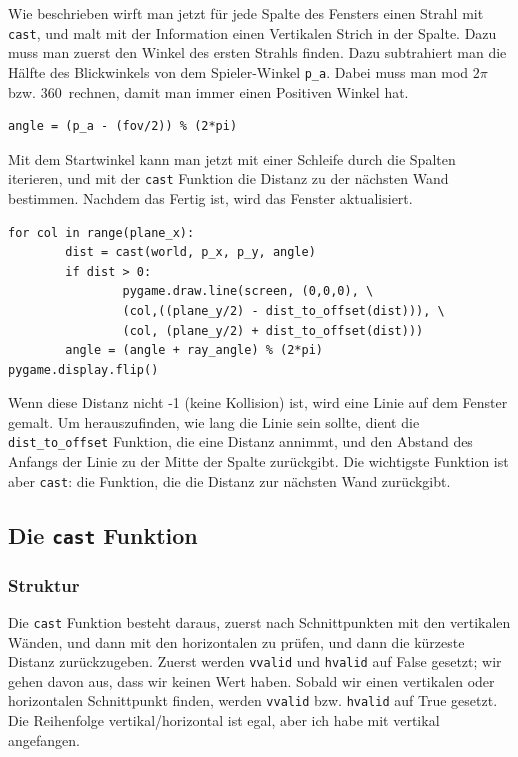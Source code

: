 \documentclass[a4paper,12pt]{report}
\begin{document}
Wie beschrieben wirft man jetzt für jede Spalte des Fensters einen Strahl mit \texttt{cast}, und malt mit der Information einen Vertikalen Strich in der Spalte. Dazu muss man zuerst den Winkel des ersten Strahls finden. Dazu subtrahiert man die Hälfte des Blickwinkels von dem Spieler-Winkel \texttt{p\_a}. Dabei muss man mod $2\pi$ bzw. 360\textdegree\ rechnen, damit man immer einen Positiven Winkel hat.
\begin{Verbatim}[baselinestretch=1.0, xleftmargin=1cm]
angle = (p_a - (fov/2)) % (2*pi)
\end{Verbatim}

Mit dem Startwinkel kann man jetzt mit einer Schleife durch die Spalten iterieren, und mit der \texttt{cast} Funktion die Distanz zu der nächsten Wand bestimmen. Nachdem das Fertig ist, wird das Fenster aktualisiert.
\begin{Verbatim}[baselinestretch=1.0, xleftmargin=1cm]
for col in range(plane_x):
        dist = cast(world, p_x, p_y, angle)
        if dist > 0:
                pygame.draw.line(screen, (0,0,0), \
                (col,((plane_y/2) - dist_to_offset(dist))), \
                (col, (plane_y/2) + dist_to_offset(dist)))
        angle = (angle + ray_angle) % (2*pi)
pygame.display.flip()
\end{Verbatim}
Wenn diese Distanz nicht -1 (keine Kollision) ist, wird eine Linie auf dem Fenster gemalt. Um herauszufinden, wie lang die Linie sein sollte, dient die \texttt{dist\_to\_offset} Funktion, die eine Distanz annimmt, und den Abstand des Anfangs der Linie zu der Mitte der Spalte zurückgibt. Die wichtigste Funktion ist aber \texttt{cast}: die Funktion, die die Distanz zur nächsten Wand zurückgibt.

\subsection{Die \texttt{cast} Funktion}
\subsubsection{Struktur}
Die \texttt{cast} Funktion besteht daraus, zuerst nach Schnittpunkten mit den vertikalen Wänden, und dann mit den horizontalen zu prüfen, und dann die kürzeste Distanz zurückzugeben. Zuerst werden \texttt{vvalid} und \texttt{hvalid} auf False gesetzt; wir gehen davon aus, dass wir keinen Wert haben. Sobald wir einen vertikalen oder horizontalen Schnittpunkt finden, werden \texttt{vvalid} bzw. \texttt{hvalid} auf True gesetzt. \\
Die Reihenfolge vertikal/horizontal ist egal, aber ich habe mit vertikal angefangen.
\end{document}
